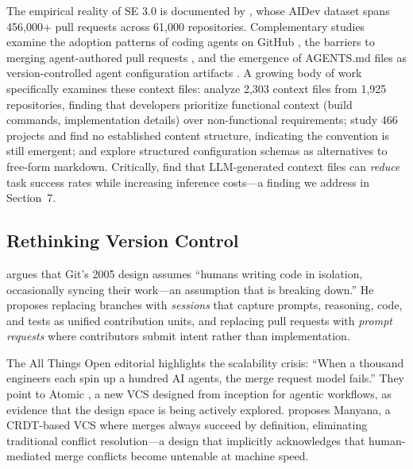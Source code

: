 \documentclass[sigconf, nonacm, anonymous=false]{acmart}
\begin{document}
The empirical reality of SE 3.0 is documented by \citet{li2025rise}, whose AIDev dataset spans 456,000+ pull requests across 61,000 repositories. Complementary studies examine the adoption patterns of coding agents on GitHub \citep{agentic2026adoption}, the barriers to merging agent-authored pull requests \citep{agentpr2026unmerged}, and the emergence of AGENTS.md files as version-controlled agent configuration artifacts \citep{agentsmd2026impact}. A growing body of work specifically examines these context files: \citet{chatlatanagulchai2025agentreadmes} analyze 2,303 context files from 1,925 repositories, finding that developers prioritize functional context (build commands, implementation details) over non-functional requirements; \citet{mohsenimofidi2025contextengineering} study 466 projects and find no established content structure, indicating the convention is still emergent; and \citet{galster2026configuring} explore structured configuration schemas as alternatives to free-form markdown. Critically, \citet{gloaguen2026evaluatingagentsmd} find that LLM-generated context files can \textit{reduce} task success rates while increasing inference costs---a finding we address in Section~7.

\subsection{Rethinking Version Control}

\citet{pinera2026rethinking} argues that Git's 2005 design assumes ``humans writing code in isolation, occasionally syncing their work---an assumption that is breaking down.'' He proposes replacing branches with \textit{sessions} that capture prompts, reasoning, code, and tests as unified contribution units, and replacing pull requests with \textit{prompt requests} where contributors submit intent rather than implementation.

The All Things Open editorial \citep{ato2026versioncontrol} highlights the scalability crisis: ``When a thousand engineers each spin up a hundred AI agents, the merge request model fails.'' They point to Atomic \citep{atomic2026}, a new VCS designed from inception for agentic workflows, as evidence that the design space is being actively explored. \citet{cohen2026manyana} proposes Manyana, a CRDT-based VCS where merges always succeed by definition, eliminating traditional conflict resolution---a design that implicitly acknowledges that human-mediated merge conflicts become untenable at machine speed.
\end{document}

